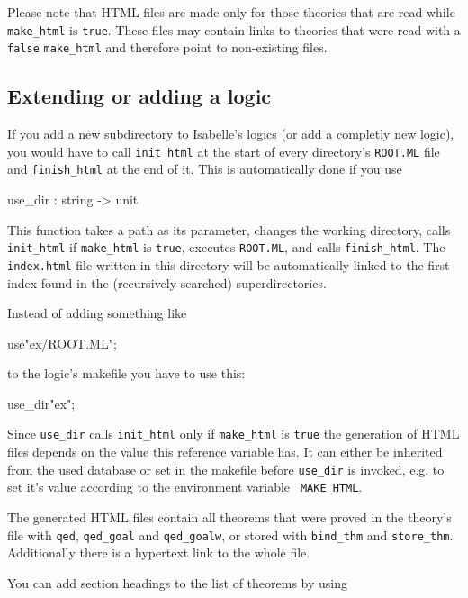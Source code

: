 Please note that HTML files are made only for those theories that are
read while {\tt make_html} is {\tt true}. These files may contain
links to theories that were read with a {\tt false} {\tt make_html}
and therefore point to non-existing files.


\subsection*{Extending or adding a logic}

If you add a new subdirectory to Isabelle's logics (or add a completly
new logic), you would have to call {\tt init_html} at the start of every
directory's {\tt ROOT.ML} file and {\tt finish_html} at the end of
it. This is automatically done if you use

\begin{ttbox}
use_dir : string -> unit
\end{ttbox}

This function takes a path as its parameter, changes the working
directory, calls {\tt init_html} if {\tt make_html} is {\tt true},
executes {\tt ROOT.ML}, and calls {\tt finish_html}. The {\tt
index.html} file written in this directory will be automatically
linked to the first index found in the (recursively searched)
superdirectories.

Instead of adding something like

\begin{ttbox}
use"ex/ROOT.ML";
\end{ttbox}

to the logic's makefile you have to use this:

\begin{ttbox}
use_dir"ex";
\end{ttbox}

Since {\tt use_dir} calls {\tt init_html} only if {\tt make_html} is
{\tt true} the generation of HTML files depends on the value this
reference variable has. It can either be inherited from the used \ML{}
database or set in the makefile before {\tt use_dir} is invoked,
e.g. to set it's value according to the environment variable {\tt
MAKE_HTML}.

The generated HTML files contain all theorems that were proved in the
theory's \ML{} file with {\tt qed}, {\tt qed_goal} and {\tt qed_goalw},
or stored with {\tt bind_thm} and {\tt store_thm}. Additionally there
is a hypertext link to the whole \ML{} file.

You can add section headings to the list of theorems by using

